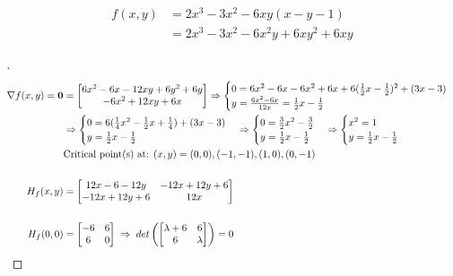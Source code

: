 \documentclass[12pt]{article}
\newenvironment{exercise}[2][Exercise]{\begin{trivlist}
\item[\hskip \labelsep {\bfseries #1}\hskip \labelsep {\bfseries #2.}]}{\end{trivlist}}
\begin{document}
\pagebreak
\begin{exercise}{3}
	\begin{align*}
		f(x,y) &= 2x^3 - 3x^2 - 6xy(x - y - 1) \\
		 &= 2x^3 - 3x^2 - 6x^2y + 6xy^2 + 6xy
	\end{align*}
\end{exercise}
\begin{proof}[]
	\begin{align*}
		\nabla f(x,y) = \bm{0} &= \begin{bmatrix} 6x^2 - 6x - 12xy + 6y^2 + 6y \\ - 6x^2 + 12xy + 6x \end{bmatrix} \Rightarrow
		\begin{cases} 0 = 6x^2 - 6x - 6x^2 + 6x + 6(\frac{1}{2}x - \frac{1}{2})^2 + (3x - 3) \\ y = \frac{6x^2 - 6x}{12x} = \frac{1}{2}x - \frac{1}{2} \end{cases} \\
		& \Rightarrow
		\begin{cases} 0 = 6(\frac{1}{4}x^2 - \frac{1}{2}x + \frac{1}{4}) + (3x - 3) \\ y = \frac{1}{2}x - \frac{1}{2} \end{cases}
		\Rightarrow
		\begin{cases} 0 = \frac{3}{2}x^2 - \frac{3}{2} \\ y = \frac{1}{2}x - \frac{1}{2} \end{cases} 
		\Rightarrow
		\begin{cases} x^2 = 1 \\ y = \frac{1}{2}x - \frac{1}{2} \end{cases} \\
		& \textnormal{Critical point(s) at: } (x,y) = (0,0), (-1, -1), (1, 0), (0, -1) \\[15pt]
		H_f(x,y) &= \begin{bmatrix} 12x - 6 -12y & -12x + 12y + 6 \\ -12x + 12y + 6 & 12x \end{bmatrix} \\[15pt]
		H_f(0,0) &= \begin{bmatrix} -6 & 6 \\ 6 & 0 \end{bmatrix} \; \Rightarrow \; det\left( \begin{bmatrix} \lambda + 6 & 6 \\ 6 & \lambda \end{bmatrix} \right) = 0 \\

\end{align*}
\end{proof}
\end{document}
